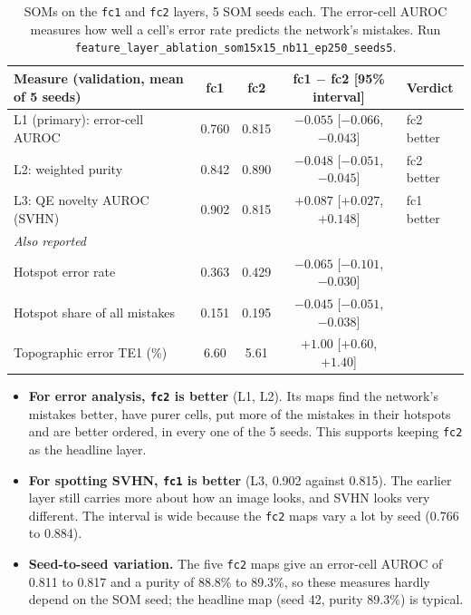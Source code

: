 \documentclass[11pt]{article}
\begin{document}
\begin{table}[H]
\centering
\renewcommand{\arraystretch}{1.12}
\footnotesize\setlength{\tabcolsep}{4pt}
\begin{tabular}{|l|c|c|c|l|}
\hline
\textbf{Measure (validation, mean of 5 seeds)} & \textbf{fc1} & \textbf{fc2} & \textbf{fc1 $-$ fc2 [95\% interval]} & \textbf{Verdict} \\ \hline
L1 (primary): error-cell AUROC & 0.760 & 0.815 & $-0.055$ [$-0.066$, $-0.043$] & fc2 better \\ \hline
L2: weighted purity & 0.842 & 0.890 & $-0.048$ [$-0.051$, $-0.045$] & fc2 better \\ \hline
L3: QE novelty AUROC (SVHN) & 0.902 & 0.815 & $+0.087$ [$+0.027$, $+0.148$] & fc1 better \\ \hline
\multicolumn{5}{|l|}{\textit{Also reported}} \\ \hline
Hotspot error rate & 0.363 & 0.429 & $-0.065$ [$-0.101$, $-0.030$] & \\ \hline
Hotspot share of all mistakes & 0.151 & 0.195 & $-0.045$ [$-0.051$, $-0.038$] & \\ \hline
Topographic error TE1 (\%) & 6.60 & 5.61 & $+1.00$ [$+0.60$, $+1.40$] & \\ \hline
\end{tabular}
\caption{SOMs on the \texttt{fc1} and \texttt{fc2} layers, 5 SOM seeds each. The error-cell AUROC measures how well a cell's error rate predicts the network's mistakes. Run \texttt{feature\_layer\_ablation\_som15x15\_nb11\_ep250\_seeds5}.}
\label{tab:ablation}
\end{table}

\begin{itemize}[leftmargin=1.4em, itemsep=2pt]
  \item \textbf{For error analysis, \texttt{fc2} is better} (L1, L2). Its maps find the network's mistakes better, have purer cells, put more of the mistakes in their hotspots and are better ordered, in every one of the 5 seeds. This supports keeping \texttt{fc2} as the headline layer.
  \item \textbf{For spotting SVHN, \texttt{fc1} is better} (L3, 0.902 against 0.815). The earlier layer still carries more about how an image looks, and SVHN looks very different. The interval is wide because the \texttt{fc2} maps vary a lot by seed (0.766 to 0.884).
  \item \textbf{Seed-to-seed variation.} The five \texttt{fc2} maps give an error-cell AUROC of 0.811 to 0.817 and a purity of 88.8\% to 89.3\%, so these measures hardly depend on the SOM seed; the headline map (seed 42, purity 89.3\%) is typical.
\end{itemize}
\end{document}
